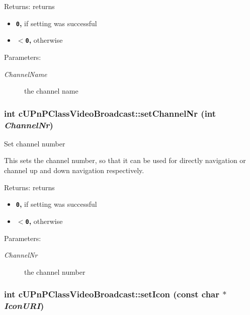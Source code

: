 \begin{Desc}
\item[Returns:]returns\begin{itemize}
\item {\bf {\tt 0},} if setting was successful\item {\bf {\tt $<$0},} otherwise \end{itemize}
\end{Desc}
\begin{Desc}
\item[Parameters:]
\begin{description}
\item[{\em ChannelName}]the channel name \end{description}
\end{Desc}
\hypertarget{classcUPnPClassVideoBroadcast_4a7804c6c86531d7e23cbc714daa6077}{
\subsubsection[{setChannelNr}]{\setlength{\rightskip}{0pt plus 5cm}int cUPnPClassVideoBroadcast::setChannelNr (int {\em ChannelNr})}}
\label{classcUPnPClassVideoBroadcast_4a7804c6c86531d7e23cbc714daa6077}


Set channel number

This sets the channel number, so that it can be used for directly navigation or channel up and down navigation respectively.

\begin{Desc}
\item[Returns:]returns\begin{itemize}
\item {\bf {\tt 0},} if setting was successful\item {\bf {\tt $<$0},} otherwise \end{itemize}
\end{Desc}
\begin{Desc}
\item[Parameters:]
\begin{description}
\item[{\em ChannelNr}]the channel number \end{description}
\end{Desc}
\hypertarget{classcUPnPClassVideoBroadcast_13e432f8a97072f3b45b1d199b82ae02}{
\subsubsection[{setIcon}]{\setlength{\rightskip}{0pt plus 5cm}int cUPnPClassVideoBroadcast::setIcon (const char $\ast$ {\em IconURI})}}
\label{classcUPnPClassVideoBroadcast_13e432f8a97072f3b45b1d199b82ae02}


